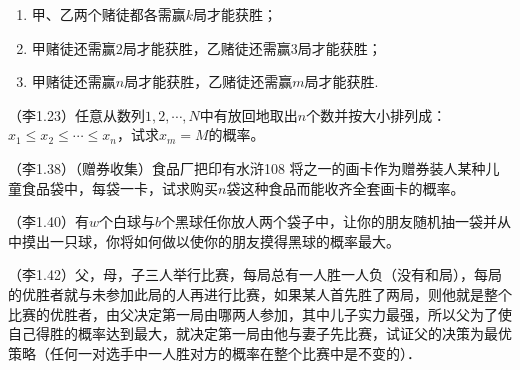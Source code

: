 \begin{problemset}[错题记录]
    \begin{enumerate}
        \item 甲、乙两个赌徒都各需赢$k$局才能获胜；
        \item 甲赌徒还需赢2局才能获胜，乙赌徒还需赢3局才能获胜；
        \item 甲赌徒还需赢$n$局才能获胜，乙赌徒还需赢$m$局才能获胜.
    \end{enumerate}
    \item （李1.23）任意从数列$1,2,\cdots,N$中有放回地取出$n$个数并按大小排列成：$x_1\le x_2\le \cdots \le x_n$，试求$x_m=M$的概率。
    \item （李1.38）（赠券收集）食品厂把印有水浒108 将之一的画卡作为赠券装人某种儿童食品袋中，每袋一卡，试求购买$n$袋这种食品而能收齐全套画卡的概率。
    \item （李1.40）有$w$个白球与$b$个黑球任你放人两个袋子中，让你的朋友随机抽一袋并从中摸出一只球，你将如何做以使你的朋友摸得黑球的概率最大。
    \item （李1.42）父，母，子三人举行比赛，每局总有一人胜一人负（没有和局），每局的优胜者就与未参加此局的人再进行比赛，如果某人首先胜了两局，则他就是整个比赛的优胜者，由父决定第一局由哪两人参加，其中儿子实力最强，所以父为了使自己得胜的概率达到最大，就决定第一局由他与妻子先比赛，试证父的决策为最优策略（任何一对选手中一人胜对方的概率在整个比赛中是不变的）．
\end{problemset}
